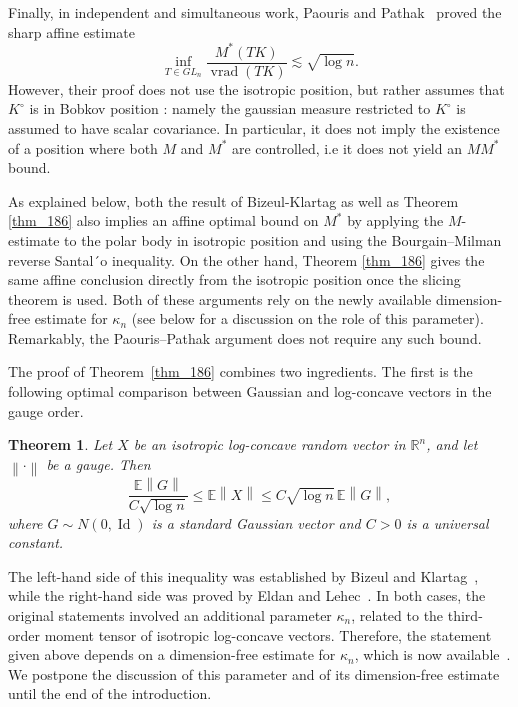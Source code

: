 \documentclass[12pt]{article}
\newtheorem{theorem}{Theorem}[section]
\theoremstyle{definition}
\theoremstyle{remark}
\newcommand{\R}{\mathbb R}
\newcommand{\E}{\mathbb E}
\newcommand{\Id}{\operatorname{Id}}
\newcommand{\norm}[1]{\left\lVert #1\right\rVert}
\begin{document}
Finally, in independent and simultaneous work, Paouris and
Pathak~\cite{PaourisPathak} proved the sharp affine estimate
\[
  \inf_{T\in GL_n}
  \frac{M^*(TK)}{\operatorname{vrad}(TK)}
  \lesssim \sqrt{\log n}.
\]
However, their proof does not use the isotropic position, but rather assumes that $K^\circ$ is in Bobkov position \cite{BobkovMPosition} : namely the gaussian measure restricted to $K^\circ$ is assumed to have scalar covariance. In particular, it does not imply the existence of a position where both $M$ and $M^*$ are controlled, i.e it does not yield an $MM^*$ bound.

As explained below, both the result of Bizeul-Klartag \cite{BizeulKlartag} as well as Theorem \ref{thm_186} also implies an affine optimal bound on $M^*$ by applying the $M$-estimate
to the polar body in isotropic position and using the Bourgain–Milman reverse Santal´o inequality. On the other
hand, Theorem \ref{thm_186} gives the same affine conclusion directly from the isotropic position
once the slicing theorem is used. Both of these arguments rely
on the newly available dimension-free estimate for $\kappa_n$ (see below for a discussion on the role of this parameter). Remarkably, the Paouris–Pathak
argument does not require any such bound.


The proof of Theorem~\ref{thm_186} combines two ingredients.
The first is the following optimal comparison between Gaussian and
log-concave vectors in the gauge order.

\begin{theorem}\label{thm_206}
Let $X$ be an isotropic log-concave random vector in $\R^n$, and let
$\norm{\cdot}$ be a gauge. Then
\begin{equation}\label{eq_209}
  \frac{\E\norm{G}}{C\sqrt{\log n}}
  \leq \E\norm{X}
  \leq C\sqrt{\log n}\,\E\norm{G},
\end{equation}
where $G\sim N(0,\Id)$ is a standard Gaussian vector and $C>0$ is a
universal constant.
\end{theorem}

The left-hand side of this inequality was established by Bizeul and
Klartag~\cite{BizeulKlartag}, while the right-hand side was proved by
Eldan and Lehec~\cite{EldanLehec}. In both cases, the original
statements involved an additional parameter $\kappa_n$, related to
the third-order moment tensor of isotropic log-concave vectors.
Therefore, the statement given above depends on a dimension-free
estimate for $\kappa_n$, which is now available~\cite{Letwin}. We
postpone the discussion of this parameter and of its dimension-free
estimate until the end of the introduction.
\end{document}

